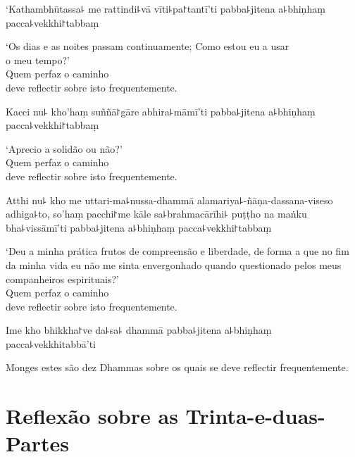 \documentclass[
  babelLanguage=english,
  final,
  webversion,
]{chantingbook}
\begin{document}
\clearpage

`Kathambhūtassa꜕ me rattindi꜕vā vīti꜕pa꜓tantī'ti pabba꜕jitena a꜕bhiṇhaṃ pacca꜕vekkhi꜓tabbaṃ

\begin{english}
  `Os dias e as noites passam continuamente; Como estou eu a usar\\ o meu tempo?'\\
 Quem perfaz o caminho\\
 deve reflectir sobre isto frequentemente.
\end{english}

Kacci nu꜕ kho'haṃ suññā꜓gāre abhira꜕māmī'ti pabba꜕jitena a꜕bhiṇhaṃ pacca꜕vekkhi꜓tabbaṃ

\begin{english}
  `Aprecio a solidão ou não?'\\
  Quem perfaz o caminho\\
  deve reflectir sobre isto frequentemente.
\end{english}

Atthi nu꜕ kho me uttari-ma꜕nussa-dhammā alamariya꜕-ñāṇa-dassana-viseso adhiga꜕to, so'haṃ pacchi꜓me kāle sa꜕brahmacārīhi꜕ puṭṭho na maṅku bha꜕vissāmī'ti pabba꜕jitena a꜕bhiṇhaṃ pacca꜕vekkhi꜓tabbaṃ

\begin{english}
  `Deu a minha prática frutos de compreensão e liberdade, de forma a que no fim da minha vida eu não me sinta envergonhado quando questionado pelos meus companheiros espirituais?'\\
  Quem perfaz o caminho\\
  deve reflectir sobre isto frequentemente.
\end{english}

Ime kho bhikkha꜓ve da꜕sa꜕ dhammā pabba꜕jitena a꜕bhiṇhaṃ pacca꜕vekkhitabbā'ti

\begin{english}
  Monges estes são dez Dhammas sobre os quais se deve reflectir frequentemente.
\end{english}

\chapter[Trinta-e-duas-Partes]{Reflexão sobre as Trinta-e-duas-Partes}


\begin{leader}
\end{leader}
\end{document}
